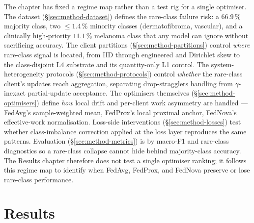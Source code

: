 \documentclass[11pt,a4paper]{report}
\begin{document}
The chapter has fixed a regime map rather than a test rig for a single
optimiser. The dataset (§\ref{sec:method-dataset}) defines the
rare-class failure risk: a $66.9\,\%$ majority class, two
$\leq 1.4\,\%$ minority classes (dermatofibroma, vascular), and a
clinically high-priority $11.1\,\%$ melanoma class that any model can
ignore without sacrificing accuracy. The client partitions
(§\ref{sec:method-partitions}) control \emph{where} rare-class signal
is located, from IID through engineered and Dirichlet skew to the
class-disjoint L4 substrate and its quantity-only L1 control. The system-heterogeneity protocols
(§\ref{sec:method-protocols}) control \emph{whether} the rare-class
client's updates reach aggregation, separating drop-stragglers
handling from $\gamma$-inexact partial-update acceptance. The
optimisers themselves (§\ref{sec:method-optimisers}) define
\emph{how} local drift and per-client work asymmetry are handled ---
FedAvg's sample-weighted mean, FedProx's local proximal anchor,
FedNova's effective-work normalisation. Loss-side interventions
(§\ref{sec:method-losses}) test whether class-imbalance correction
applied at the loss layer reproduces the same patterns. Evaluation
(§\ref{sec:method-metrics}) is by macro-F1 and rare-class diagnostics
so a rare-class collapse cannot hide behind majority-class accuracy.
The Results chapter therefore does not test a single optimiser
ranking; it follows this regime map to identify when FedAvg, FedProx,
and FedNova preserve or lose rare-class performance.



\chapter{Results}
\label{ch:results}




\end{document}
